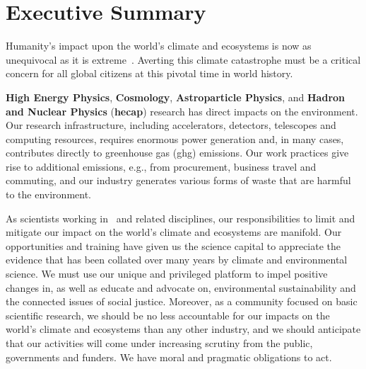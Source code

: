 \documentclass[../SustainableHEP.tex]{subfiles}
\begin{document}
\RaggedRight
\sloppy
\newpage


\section*{Executive Summary}
\label{sec:Executive_Summary}

Humanity's impact upon the world's climate and ecosystems is now as unequivocal as it is extreme~\cite{IPCC2021reportSPM}. Averting this climate catastrophe 
must be a critical concern for all global citizens at this pivotal time in world history.

\textbf{High Energy Physics}, \textbf{Cosmology}, \textbf{Astroparticle Physics}, and \textbf{Hadron and Nuclear Physics} (\textbf{\acrshort{hecap}}) research has direct impacts on the environment.  Our research infrastructure, including accelerators, detectors, telescopes and computing resources, requires enormous power generation and, in many cases, contributes directly to greenhouse gas (\acrshort{ghg}) emissions. Our work practices give rise to additional emissions, e.g., from procurement, business travel and commuting, and our industry generates various forms of waste that are harmful to the environment.

As scientists working in \ACR\ and related disciplines, our responsibilities to limit and mitigate our impact on the world's climate and ecosystems are manifold. Our opportunities and training have given us the science capital to appreciate the evidence that has been collated over many years by climate and environmental science. We must use our unique and privileged platform to impel positive changes in, as well as educate and advocate on, environmental sustainability and the connected issues of social justice. Moreover, as a community focused on basic scientific research, we should be no less accountable for our impacts on the world's climate and ecosystems than any other industry, and we should anticipate that our activities will come under increasing scrutiny from the public, governments and funders. We have moral and pragmatic obligations to act.
\end{document}

